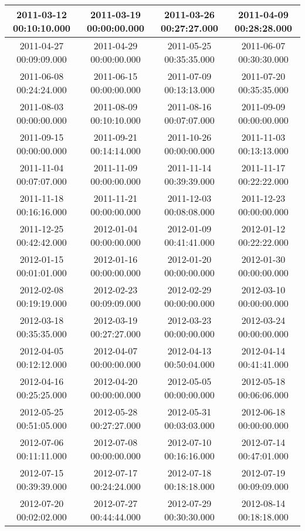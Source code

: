 \begin{longtable}{c c c c}
2011-03-12 00:10:10.000 & 
2011-03-19 00:00:00.000 & 
2011-03-26 00:27:27.000 & 
2011-04-09 00:28:28.000 \\ \midrule
2011-04-27 00:09:09.000 & 
2011-04-29 00:00:00.000 & 
2011-05-25 00:35:35.000 & 
2011-06-07 00:30:30.000 \\ \midrule
2011-06-08 00:24:24.000 & 
2011-06-15 00:00:00.000 & 
2011-07-09 00:13:13.000 & 
2011-07-20 00:35:35.000 \\ \midrule
2011-08-03 00:00:00.000 & 
2011-08-09 00:10:10.000 & 
2011-08-16 00:07:07.000 & 
2011-09-09 00:00:00.000 \\ \midrule
2011-09-15 00:00:00.000 & 
2011-09-21 00:14:14.000 & 
2011-10-26 00:00:00.000 & 
2011-11-03 00:13:13.000 \\ \midrule
2011-11-04 00:07:07.000 & 
2011-11-09 00:00:00.000 & 
2011-11-14 00:39:39.000 & 
2011-11-17 00:22:22.000 \\ \midrule
2011-11-18 00:16:16.000 & 
2011-11-21 00:00:00.000 & 
2011-12-03 00:08:08.000 & 
2011-12-23 00:00:00.000 \\ \midrule
2011-12-25 00:42:42.000 & 
2012-01-04 00:00:00.000 & 
2012-01-09 00:41:41.000 & 
2012-01-12 00:22:22.000 \\ \midrule
2012-01-15 00:01:01.000 & 
2012-01-16 00:00:00.000 & 
2012-01-20 00:00:00.000 & 
2012-01-30 00:00:00.000 \\ \midrule
2012-02-08 00:19:19.000 & 
2012-02-23 00:09:09.000 & 
2012-02-29 00:00:00.000 & 
2012-03-10 00:00:00.000 \\ \midrule
2012-03-18 00:35:35.000 & 
2012-03-19 00:27:27.000 & 
2012-03-23 00:00:00.000 & 
2012-03-24 00:00:00.000 \\ \midrule
2012-04-05 00:12:12.000 & 
2012-04-07 00:00:00.000 & 
2012-04-13 00:50:04.000 & 
2012-04-14 00:41:41.000 \\ \midrule
2012-04-16 00:25:25.000 & 
2012-04-20 00:00:00.000 & 
2012-05-05 00:00:00.000 & 
2012-05-18 00:06:06.000 \\ \midrule
2012-05-25 00:51:05.000 & 
2012-05-28 00:27:27.000 & 
2012-05-31 00:03:03.000 & 
2012-06-18 00:00:00.000 \\ \midrule
2012-07-06 00:11:11.000 & 
2012-07-08 00:00:00.000 & 
2012-07-10 00:16:16.000 & 
2012-07-14 00:47:01.000 \\ \midrule
2012-07-15 00:39:39.000 & 
2012-07-17 00:24:24.000 & 
2012-07-18 00:18:18.000 & 
2012-07-19 00:09:09.000 \\ \midrule
2012-07-20 00:02:02.000 & 
2012-07-27 00:44:44.000 & 
2012-07-29 00:30:30.000 & 
2012-08-14 00:18:18.000 \\ \midrule

\end{longtable}
